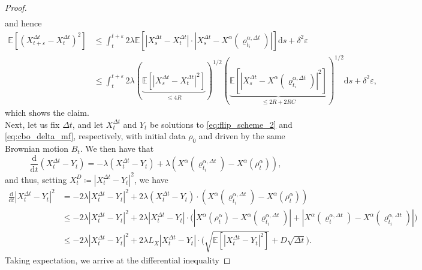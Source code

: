 \documentclass[reqno]{amsart}
\numberwithin{algorithm}{section}
\newcommand{\diff}{\mathrm{d}}
\newcommand{\EE}{{\mathbb E}}
\newcommand{\Xalpha}{{X^\alpha}}
\begin{document}
{\begin{proof}
\begin{equation*}
\begin{split}
        \end{split}
    \end{equation*}
    and hence
    \begin{equation*}
        \begin{split}
            \EE[(X_{t + \varepsilon}^{\Delta t} - X_t^{\Delta t})^2] &\leq \int_t^{t + \varepsilon} 2 \lambda \EE[|X_s^{\Delta t} - X_t^{\Delta t}| \cdot |X_s^{\Delta t} - \Xalpha(\varrho_{t_i}^{\alpha,\Delta t})|] \diff s + \delta^2 \varepsilon \\
            &\leq \int_t^{t + \varepsilon} 2 \lambda (\underbrace{\EE[|X_s^{\Delta t} - X_t^{\Delta t}|^2]}_{\leq 4 R})^{1/2} (\underbrace{\EE[|X_s^{\Delta t} - \Xalpha(\varrho_{t_i}^{\alpha,\Delta t})|^2]}_{\leq 2R + 2RC})^{1/2} \diff s + \delta^2 \varepsilon,
        \end{split}
    \end{equation*}
    which shows the claim. \\
    Next, let us fix $\Delta t$, and let $X_t^{\Delta t}$ and $Y_t$ be solutions to \eqref{eq:flip_scheme_2} and \eqref{eq:cbo_delta_mf}, respectively, with initial data $\rho_0$ and driven by the same Brownian motion $B_t$.
    We then have that
    \begin{equation}
        \frac{\diff}{\diff t} (X_t^{\Delta t} - Y_t) = -\lambda (X_t^{\Delta t} - Y_t) + \lambda (\Xalpha(\varrho_{t_i}^{\alpha,\Delta t}) - \Xalpha(\rho^\alpha_t)),
    \end{equation}
    and thus, setting $X^D_t \coloneqq |X_t^{\Delta t} - Y_t|^2$, we have
    \begin{equation}
        \begin{split}
            \frac{\diff}{\diff t} |X_t^{\Delta t} - Y_t|^2 &= -2 \lambda |X_t^{\Delta t} - Y_t|^2 + 2 \lambda (X_t^{\Delta t} - Y_t) \cdot (\Xalpha(\varrho_{t_i}^{\alpha,\Delta t}) - \Xalpha(\rho^\alpha_t)) \\
            &\leq -2 \lambda |X_t^{\Delta t} - Y_t|^2 + 2 \lambda |X_t^{\Delta t} - Y_t| \cdot \Big(|X^\alpha(\rho^\alpha_t) - X^\alpha(\varrho_{t_i}^{\alpha,\Delta t})| + |X^\alpha(\varrho_{t}^{\alpha,\Delta t}) - X^\alpha(\varrho_{t_i}^{\alpha,\Delta t})|\Big) \\
            &\leq -2 \lambda |X_t^{\Delta t} - Y_t|^2 + 2 \lambda L_X |X_t^{\Delta t} - Y_t| \cdot \Big(\sqrt{\EE[|X_t^{\Delta t} - Y_t|^2]} + D \sqrt{\Delta t}\Big).
        \end{split}
    \end{equation}
    Taking expectation, we arrive at the differential inequality

\end{proof}}
\end{document}
